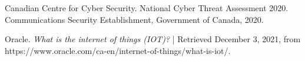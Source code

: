 \documentclass[11pt]{article}
\begin{document}
\pagebreak

{} 

\begin{thebibliography}{9}

  Canadian Centre for Cyber Security. National Cyber Threat Assessment 2020. 
  Communications Security Establishment, Government of Canada, 2020.

  Oracle. \textit{What is the internet of things (IOT)?} | 
  Retrieved December 3, 2021, from https://www.oracle.com/ca-en/internet-of-things/what-is-iot/. 
\end{thebibliography}
\end{document}
